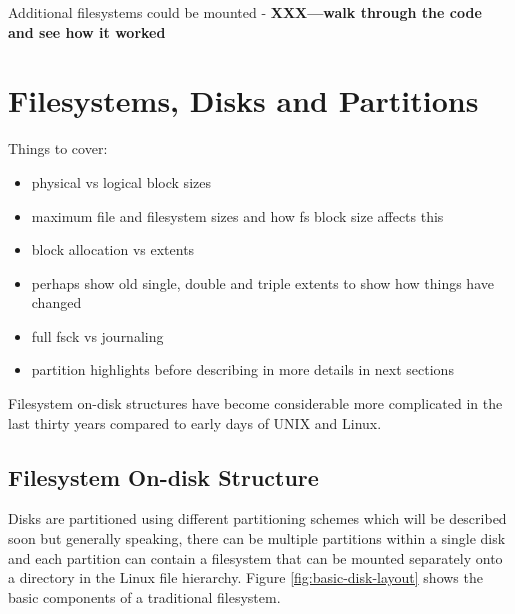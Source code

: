 Additional filesystems could be mounted - \textbf{XXX---walk through the code and see how it worked}



\section{Filesystems, Disks and Partitions}\label{partitions}

Things to cover:

\begin{itemize}
	\item physical vs logical block sizes
	\item maximum file and filesystem sizes and how fs block size affects this
	\item block allocation vs extents
	\item perhaps show old single, double and triple extents to show how things have changed
	\item full fsck vs journaling
	\item partition highlights before describing in more details in next sections
\end{itemize}

Filesystem on-disk structures have become considerable more complicated in the last thirty years compared to early days of UNIX and Linux.


\subsection{Filesystem On-disk Structure}

Disks are partitioned using different partitioning schemes which will be described soon but generally speaking, there can be multiple partitions within a single disk and each partition can contain a filesystem that can be mounted separately onto a directory in the Linux file hierarchy. Figure \ref{fig:basic-disk-layout} shows the basic components of a traditional filesystem.

